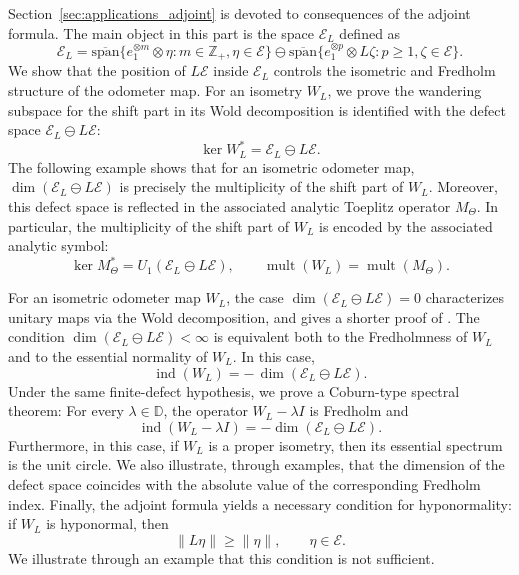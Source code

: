 \documentclass[12pt]{amsart}
\theoremstyle{definition}
\theoremstyle{remark}
\def \D{\mathbb{D}}
\def \Z{\mathbb{Z}}
\newcommand{\cle}{\mathcal{E}}
\newcommand{\ind}{\operatorname{ind}}
\newcommand{\ol}{\overline}
\numberwithin{equation}{section}
\begin{document}
Section~\ref{sec:applications_adjoint} is devoted to consequences of the adjoint formula. The main object in this part is the space $\cle_L$ defined as 
\begin{equation*} 
\cle_{L} = \ol{\text{span}}\{e_{1}^{ \otimes m}\otimes\eta : m\in\Z_{+},\eta\in\cle\} \ominus \ol{\text{span}}\{e_{1}^{\otimes p}\otimes L\zeta : p\geq 1,\zeta\in\cle\}.
\end{equation*}
We show that the position of $L\cle$ inside $\cle_L$
controls the isometric and Fredholm structure of the odometer map. For an isometry $W_L$, we prove the wandering subspace for the shift part in its Wold decomposition is identified with the defect space $\cle_L\ominus L\cle$:
\[
\ker W_L^*=\cle_L\ominus L\cle.
\]  
The following example shows that for an isometric odometer map, $\dim (\cle_L\ominus L\cle) $ is precisely the multiplicity of the shift part of $W_L$. Moreover, this defect space is reflected in the associated analytic Toeplitz operator $M_\Theta$. In particular, the multiplicity of the shift part of $W_L$ is encoded by the associated analytic symbol:
\[
\ker M_\Theta^*=U_1(\cle_L\ominus L\cle),
\qquad
\operatorname{mult}(W_L)=\operatorname{mult}(M_\Theta).
\]

For an isometric odometer map $W_L$, the case $\dim(\cle_L\ominus L\cle)=0$ characterizes unitary maps via the Wold decomposition, and gives a shorter proof of \cite[Theorem~4.4]{mansi2025}. The condition $\dim(\cle_L\ominus L\cle)<\infty$
is equivalent both to the Fredholmness of \(W_L\) and to the essential normality of \(W_L\). In this case,
\[
\operatorname{ind}(W_L)=-\,\dim(\cle_L\ominus L\cle).
\]
Under the same finite-defect hypothesis, we prove a Coburn-type spectral theorem:
For every $\lambda\in\D$, the operator $W_L-\lambda I$ is Fredholm and
\[
\ind(W_L-\lambda I)
=
-\dim(\cle_L\ominus L\cle).
\]
Furthermore, in this case, if $W_L$ is a proper isometry, then its essential spectrum is the unit circle. We also illustrate, through examples, that the dimension of the defect space coincides with the absolute value of the corresponding Fredholm index.
Finally, the adjoint formula yields a necessary condition for
hyponormality: if $W_L$ is hyponormal, then
\[
\|L\eta\|\geq \|\eta\|,\qquad \eta\in\cle.
\]
We illustrate through an example that this condition is not sufficient.
\end{document}
